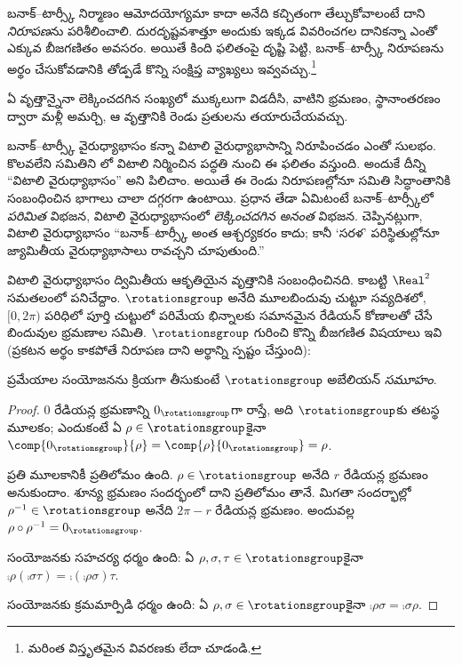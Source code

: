 \documentclass[../../../include/open-logic-section]{subfiles}
\begin{document}

బనాక్--టార్స్కీ నిర్మాణం ఆమోదయోగ్యమా కాదా అనేది కచ్చితంగా తేల్చుకోవాలంటే దాని \emph{నిరూపణ}ను పరిశీలించాలి. దురదృష్టవశాత్తూ అందుకు ఇక్కడ వివరించగల దానికన్నా ఎంతో ఎక్కువ బీజగణితం అవసరం. అయితే కింది ఫలితంపై దృష్టి పెట్టి, బనాక్--టార్స్కీ నిరూపణను అర్థం చేసుకోవడానికి తోడ్పడే కొన్ని సంక్షిప్త వ్యాఖ్యలు ఇవ్వవచ్చు.\footnote{మరింత విస్తృతమైన వివరణకు \cite{Weston2003} లేదా \cite{Wagon2016} చూడండి.}

\begin{thm}[విటాలి వైరుధ్యాభాసం ($\ZFC$లో)]
ఏ వృత్తాన్నైనా లెక్కించదగిన సంఖ్యలో ముక్కలుగా విడదీసి, వాటిని
భ్రమణం, స్థానాంతరణం ద్వారా మళ్లీ అమర్చి, ఆ వృత్తానికి రెండు
ప్రతులను తయారుచేయవచ్చు.
\end{thm}

బనాక్--టార్స్కీ వైరుధ్యాభాసం కన్నా విటాలి వైరుధ్యాభాసాన్ని
నిరూపించడం ఎంతో సులభం. కొలవలేని సమితిని
\citeyear{Vitali1905}లో విటాలి నిర్మించిన పద్ధతి నుంచి ఈ ఫలితం వస్తుంది.
అందుకే దీన్ని ``విటాలి వైరుధ్యాభాసం'' అని పిలిచాం. అయితే ఈ
రెండు నిరూపణల్లోనూ సమితి సిద్ధాంతానికి సంబంధించిన భాగాలు
చాలా దగ్గరగా ఉంటాయి. ప్రధాన తేడా ఏమిటంటే బనాక్--టార్స్కీలో \emph{పరిమిత} విభజన, విటాలి వైరుధ్యాభాసంలో \emph{లెక్కించదగిన అనంత} విభజన. \citet{Weston2003} చెప్పినట్లుగా, విటాలి వైరుధ్యాభాసం ``బనాక్--టార్స్కీ అంత ఆశ్చర్యకరం కాదు; కానీ `సరళ' పరిస్థితుల్లోనూ జ్యామితీయ వైరుధ్యాభాసాలు రావచ్చని చూపుతుంది.''

విటాలి వైరుధ్యాభాసం ద్విమితీయ ఆకృతియైన వృత్తానికి సంబంధించినది. కాబట్టి $\Real^2$ సమతలంలో పనిచేద్దాం. $\rotationsgroup$ అనేది మూలబిందువు చుట్టూ సవ్యదిశలో, $[0,2\pi)$ పరిధిలో పూర్తి చుట్టులో పరిమేయ భిన్నాలకు సమానమైన రేడియన్ కోణాలతో చేసే బిందువుల భ్రమణాల సమితి. $\rotationsgroup$ గురించి కొన్ని బీజగణిత విషయాలు ఇవి (ప్రకటన అర్థం కాకపోతే నిరూపణ దాని అర్థాన్ని స్పష్టం చేస్తుంది):

\begin{lem}
ప్రమేయాల సంయోజనను క్రియగా తీసుకుంటే $\rotationsgroup$ అబేలియన్ \emph{సమూహం}.
\end{lem}

\begin{proof}
$0$ రేడియన్ల భ్రమణాన్ని $0_{\rotationsgroup}$గా రాస్తే, అది $\rotationsgroup$కు తటస్థ మూలకం; ఎందుకంటే ఏ $\rho \in \rotationsgroup$కైనా $\comp{0_{\rotationsgroup}}{\rho} = \comp{\rho}{0_{\rotationsgroup}} =
\rho$.

ప్రతి మూలకానికీ ప్రతిలోమం ఉంది. $\rho \in \rotationsgroup$ అనేది $r$ రేడియన్ల భ్రమణం అనుకుందాం.
శూన్య భ్రమణం సందర్భంలో దాని ప్రతిలోమం తానే. మిగతా సందర్భాల్లో $\rho^{-1} \in \rotationsgroup$ అనేది $2\pi - r$ రేడియన్ల భ్రమణం. అందువల్ల $\rho \circ \rho^{-1} = 0_\rotationsgroup$.

సంయోజనకు సహచర్య ధర్మం ఉంది: ఏ $\rho, \sigma, \tau \in
\rotationsgroup$కైనా $\comp{\rho}{(\comp{\sigma}{\tau})} =
\comp{(\comp{\rho}{\sigma})}{\tau}$.

సంయోజనకు క్రమమార్పిడి ధర్మం ఉంది: ఏ $\rho, \sigma \in \rotationsgroup$కైనా $\comp{\rho}{\sigma} =
\comp{\sigma}{\rho}$.
\end{proof}
\end{document}
